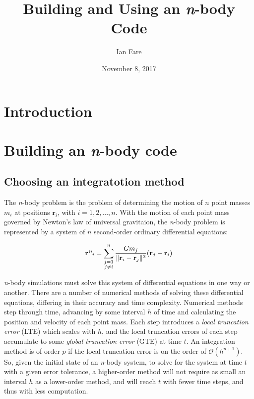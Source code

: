 \documentclass{article}
\title{Building and Using an \textit{n}-body Code}
\author{Ian Fare}
\date{November 8, 2017}
\DeclarePairedDelimiter{\norm}{\lVert}{\rVert}
\begin{document}
\maketitle

\section{Introduction}

\section{Building an \textit{n}-body code}

\subsection{Choosing an integratotion method}

The \textit{n}-body problem is the problem of determining the motion of $n$ point masses $m_i$ at positions $\textbf{r}_i$, with $i=1,2,...,n$. With the motion of each point mass governed by Newton's law of universal gravitaion, the \textit{n}-body problem is represented by a system of $n$ second-order ordinary differential equations:

\begin{equation}
    \textbf{r''}_i = \sum_{\substack{j=1\\j\neq i}}^n \frac{Gm_j}{\norm{\textbf{r}_i-\textbf{r}_j}^3}(\textbf{r}_j-\textbf{r}_i)
\end{equation}

\textit{n}-body simulations must solve this system of differential equations in one way or another. There are a number of numerical methods of solving these differential equations, differing in their accuracy and time complexity. Numerical methods step through time, advancing by some interval $h$ of time and calculating the position and velocity of each point mass. Each step introduces a \textit{local truncation error} (LTE) which scales with $h$, and the local truncation errors of each step accumulate to some \textit{global truncation error} (GTE) at time $t$. An integration method is of order $p$ if the local truncation error is on the order of $\mathcal{O}(h^{p+1})$. So, given the initial state of an \textit{n}-body system, to solve for the system at time $t$ with a given error tolerance, a higher-order method will not require as small an interval $h$ as a lower-order method, and will reach $t$ with fewer time steps, and thus with less computation. 
\end{document}
